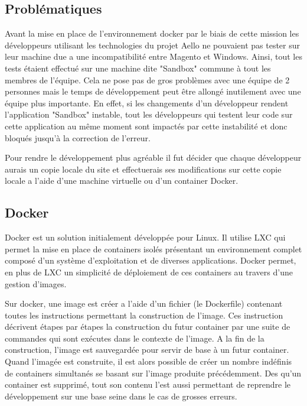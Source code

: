 \documentclass{Article}
\begin{document}
	\subsection{Problématiques}

	Avant la mise en place de l'environnement docker par le biais de cette mission les développeurs utilisant les technologies du projet Aello ne pouvaient pas tester sur leur machine due a une incompatibilité entre Magento et Windows. Ainsi, tout les tests étaient effectué sur une machine dite "Sandbox" commune à tout les membres de l'équipe. Cela ne pose pas de gros problèmes avec une équipe de 2 personnes mais le temps de développement peut être allongé inutilement avec une équipe plus importante. En effet, si les changements d'un développeur rendent l'application "Sandbox" instable, tout les développeurs qui testent leur code sur cette application au même moment sont impactés par cette instabilité et donc bloqués jusqu’à la correction de l’erreur.

	Pour rendre le développement plus agréable il fut décider que chaque développeur aurais un copie locale du site et effectuerais ses modifications sur cette copie locale a l'aide d'une machine virtuelle ou d'un container Docker.

	\subsection{Docker} 

	Docker est un solution initialement développée pour Linux. Il utilise LXC qui permet la mise en place de containers isolés présentant un environnement complet composé d'un système d'exploitation et de diverses applications. Docker permet, en plus de LXC un simplicité de déploiement de ces containers au travers d'une gestion d'images.

	Sur docker, une image est créer a l'aide d'un fichier (le Dockerfile) contenant toutes les instructions permettant la construction de l'image. Ces instruction décrivent étapes par étapes la construction du futur container par une suite de commandes qui sont exécutes dans le contexte de l'image. A la fin de la construction, l'image est sauvegardée pour servir de base à un futur container. Quand l'imagée est construite, il est alors possible de créer un nombre indéfinis de containers simultanés se basant sur l'image produite précédemment. Des qu'un container est supprimé, tout son contenu l'est aussi permettant de reprendre le développement sur une base seine dans le cas de grosses erreurs.
\end{document}
